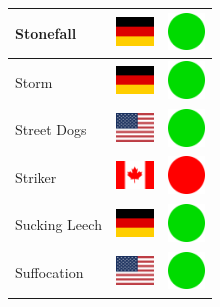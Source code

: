 \documentclass[12pt, a4paper, twoside]{report}
\begin{document}
\begin{center}
\begin{longtable}{|p{5cm}|p{2cm}|p{2cm}|}
Stonefall & \includegraphics[width=1cm]{4x3/de} & \includegraphics[width=1cm]{likes/y} \\ \hline
Storm & \includegraphics[width=1cm]{4x3/de} & \includegraphics[width=1cm]{likes/y} \\ \hline
Street Dogs & \includegraphics[width=1cm]{4x3/us} & \includegraphics[width=1cm]{likes/y} \\ \hline
Striker & \includegraphics[width=1cm]{4x3/ca} & \includegraphics[width=1cm]{likes/n} \\ \hline
Sucking Leech & \includegraphics[width=1cm]{4x3/de} & \includegraphics[width=1cm]{likes/y} \\ \hline
Suffocation & \includegraphics[width=1cm]{4x3/us} & \includegraphics[width=1cm]{likes/y} \\ \hline

\end{longtable}
\end{center}
\end{document}
